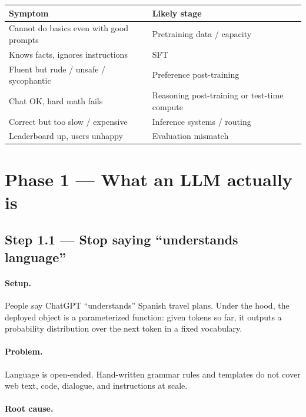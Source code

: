 \documentclass[11pt,a4paper]{article}
\begin{document}
\begin{table}[ht]
\centering\small
\begin{tabularx}{\textwidth}{@{}YY@{}}
\toprule
\textbf{Symptom} & \textbf{Likely stage} \\
\midrule
Cannot do basics even with good prompts & Pretraining data / capacity \\
Knows facts, ignores instructions & SFT \\
Fluent but rude / unsafe / sycophantic & Preference post-training \\
Chat OK, hard math fails & Reasoning post-training or test-time compute \\
Correct but too slow / expensive & Inference systems / routing \\
Leaderboard up, users unhappy & Evaluation mismatch \\
\bottomrule
\end{tabularx}
\end{table}


\bigskip


\clearpage
\section{Phase 1 --- What an LLM actually is}


\subsection{Step 1.1 --- Stop saying ``understands language''}


\paragraph{Setup.}

People say ChatGPT ``understands'' Spanish travel plans. Under the hood, the deployed object is a parameterized function: given tokens so far, it outputs a probability distribution over the next token in a fixed vocabulary.


\paragraph{Problem.}

Language is open-ended. Hand-written grammar rules and templates do not cover web text, code, dialogue, and instructions at scale.


\paragraph{Root cause.}
\end{document}
